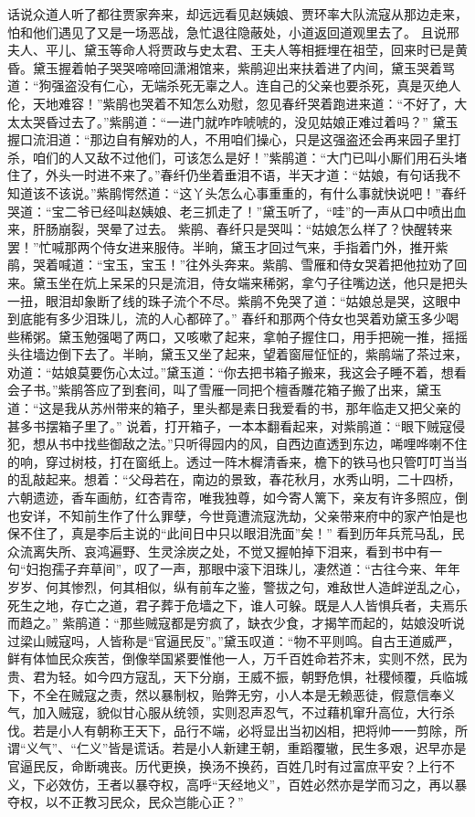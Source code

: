 \documentclass[12pt,oneside]{book}
\begin{document}
话说众道人听了都往贾家奔来，却远远看见赵姨娘、贾环率大队流寇从那边走来，怕和他们遇见了又是一场恶战，急忙退往隐蔽处，小道返回道观里去了。
且说邢夫人、平儿、黛玉等命人将贾政与史太君、王夫人等相捱埋在祖茔，回来时已是黄昏。黛玉握着帕子哭哭啼啼回潇湘馆来，紫鹃迎出来扶着进了内间，黛玉哭着骂道：“狗强盗没有仁心，无端杀死无辜之人。连自己的父亲也要杀死，真是灭绝人伦，天地难容！”紫鹃也哭着不知怎么劝慰，忽见春纤哭着跑进来道：“不好了，大太太哭昏过去了。”紫鹃道：“一进门就咋咋唬唬的，没见姑娘正难过着吗？”
黛玉握口流泪道：“那边自有解劝的人，不用咱们操心，只是这强盗还会再来园子里打杀，咱们的人又敌不过他们，可该怎么是好！”紫鹃道：“大门已叫小厮们用石头堵住了，外头一时进不来了。”春纤仍坐着垂泪不语，半天才道：“姑娘，有句话我不知道该不该说。”紫鹃愕然道：“这丫头怎么心事重重的，有什么事就快说吧！”春纤哭道：“宝二爷已经叫赵姨娘、老三抓走了！”黛玉听了，“哇”的一声从口中喷出血来，肝肠崩裂，哭晕了过去。
紫鹃、春纤只是哭叫：“姑娘怎么样了？快醒转来罢！”忙喊那两个侍女进来服侍。半晌，黛玉才回过气来，手指着门外，推开紫鹃，哭着喊道：“宝玉，宝玉！”往外头奔来。紫鹃、雪雁和侍女哭着把他拉劝了回来。黛玉坐在炕上呆呆的只是流泪，侍女端来稀粥，拿勺子往嘴边送，他只是把头一扭，眼泪却象断了线的珠子流个不尽。紫鹃不免哭了道：“姑娘总是哭，这眼中到底能有多少泪珠儿，流的人心都碎了。”
春纤和那两个侍女也哭着劝黛玉多少喝些稀粥。黛玉勉强喝了两口，又咳嗽了起来，拿帕子握住口，用手把碗一推，摇摇头往墙边倒下去了。半晌，黛玉又坐了起来，望着窗屉怔怔的，紫鹃端了茶过来，劝道：“姑娘莫要伤心太过。”黛玉道：“你去把书箱子搬来，我这会子睡不着，想看会子书。”紫鹃答应了到套间，叫了雪雁一同把个檀香雕花箱子搬了出来，黛玉道：“这是我从苏州带来的箱子，里头都是素日我爱看的书，那年临走又把父亲的甚多书摆箱子里了。”
说着，打开箱子，一本本翻看起来，对紫鹃道：“眼下贼寇侵犯，想从书中找些御敌之法。”只听得园内的风，自西边直透到东边，唏哩哗喇不住的响，穿过树枝，打在窗纸上。透过一阵木樨清香来，檐下的铁马也只管叮叮当当的乱敲起来。想着：“父母若在，南边的景致，春花秋月，水秀山明，二十四桥，六朝遗迹，香车画舫，红杏青帘，唯我独尊，如今寄人篱下，亲友有许多照应，倒也安详，不知前生作了什么罪孽，今世竟遭流寇洗劫，父亲带来府中的家产怕是也保不住了，真是李后主说的“此间日中只以眼泪洗面”矣！”
看到历年兵荒马乱，民众流离失所、哀鸿遍野、生灵涂炭之处，不觉又握帕掉下泪来，看到书中有一句“妇抱孺子弃草间”，叹了一声，那眼中滚下泪珠儿，凄然道：“古往今来、年年岁岁、何其惨烈，何其相似，纵有前车之鉴，警拔之句，难敌世人造衅逆乱之心，死生之地，存亡之道，君子葬于危墙之下，谁人可躲。既是人人皆惧兵者，夫焉乐而趋之。”
紫鹃道：“那些贼寇都是穷疯了，缺衣少食，才揭竿而起的，姑娘没听说过梁山贼寇吗，人皆称是“官逼民反”。”黛玉叹道：“物不平则鸣。自古王道威严，鲜有体恤民众疾苦，倒像举国紧要惟他一人，万千百姓命若芥末，实则不然，民为贵、君为轻。如今四方寇乱，天下分崩，王威不振，朝野危惧，社稷倾覆，兵临城下，不全在贼寇之责，然以暴制权，贻弊无穷，小人本是无赖恶徒，假意信奉义气，加入贼寇，貌似甘心服从统领，实则忍声忍气，不过藉机窜升高位，大行杀伐。若是小人有朝称王天下，品行不端，必将显出当初凶相，把将帅一一剪除，所谓“义气”、“仁义”皆是谎话。若是小人新建王朝，重蹈覆辙，民生多艰，迟早亦是官逼民反，命断魂丧。历代更换，换汤不换药，百姓几时有过富庶平安？上行不义，下必效仿，王者以暴夺权，高呼“天经地义”，百姓必然亦是学而习之，再以暴夺权，以不正教习民众，民众岂能心正？”
\end{document}
